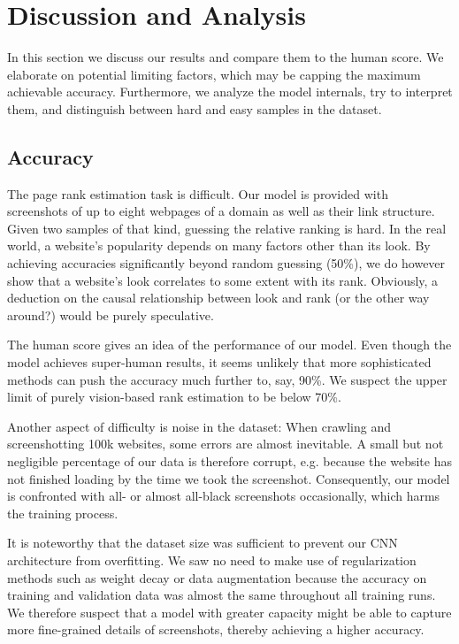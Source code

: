 \section{Discussion and Analysis}
\label{sec:discussion}

In this section we discuss our results and compare them to the human score. We elaborate on potential limiting factors, which may be capping the maximum achievable accuracy. Furthermore, we analyze the model internals, try to interpret them, and distinguish between hard and easy samples in the dataset.

\subsection{Accuracy}

The page rank estimation task is difficult. Our model is provided with screenshots of up to eight webpages of a domain as well as their link structure. Given two samples of that kind, guessing the relative ranking is hard. In the real world, a website's popularity depends on many factors other than its look. By achieving accuracies significantly beyond random guessing (50\%), we do however show that a website's look correlates to some extent with its rank. Obviously, a deduction on the causal relationship between look and rank (or the other way around?) would be purely speculative.

The human score gives an idea of the performance of our model. Even though the model achieves super-human results, it seems unlikely that more sophisticated methods can push the accuracy much further to, say, 90\%. We suspect the upper limit of purely vision-based rank estimation to be below 70\%.

Another aspect of difficulty is noise in the dataset: When crawling and screenshotting 100k websites, some errors are almost inevitable. A small but not negligible percentage of our data is therefore corrupt, e.g. because the website has not finished loading by the time we took the screenshot. Consequently, our model is confronted with all- or almost all-black screenshots occasionally, which harms the training process.

It is noteworthy that the dataset size was sufficient to prevent our CNN architecture from overfitting. We saw no need to make use of regularization methods such as weight decay or data augmentation because the accuracy on training and validation data was almost the same throughout all training runs. We therefore suspect that a model with greater capacity might be able to capture more fine-grained details of screenshots, thereby achieving a higher accuracy.

